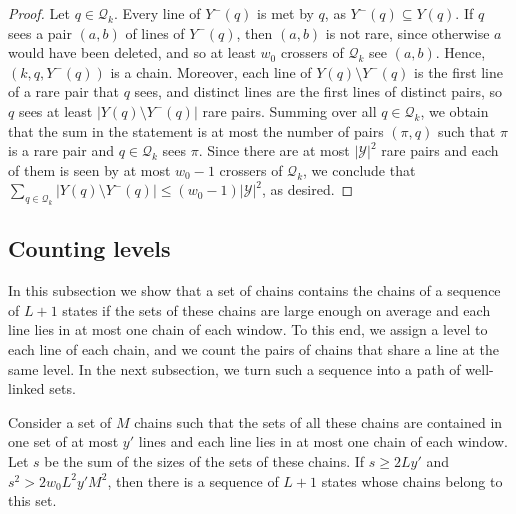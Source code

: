 \documentclass[fontsize=12pt,leading=14pt]{fullpaper}
\newcommand{\Qcal}{\mathcal{Q}}
\newcommand{\Ycal}{\mathcal{Y}}
\begin{document}
\begin{proof}
  Let $q\in\Qcal_k$.
  Every line of $Y^-(q)$ is met by $q$, as $Y^-(q)\subseteq Y(q)$.
  If $q$ sees a pair $(a,b)$ of lines of $Y^-(q)$, then $(a,b)$ is not rare, since otherwise $a$ would have been deleted, and so at least $w_0$ crossers of $\Qcal_k$ see $(a,b)$.
  Hence, $(k,q,Y^-(q))$ is a chain.
  Moreover, each line of $Y(q)\setminus Y^-(q)$ is the first line of a rare pair that $q$ sees, and distinct lines are the first lines of distinct pairs, so $q$ sees at least $|Y(q)\setminus Y^-(q)|$ rare pairs.
  Summing over all $q\in\Qcal_k$, we obtain that the sum in the statement is at most the number of pairs $(\pi,q)$ such that $\pi$ is a rare pair and $q\in\Qcal_k$ sees $\pi$.
  Since there are at most $|\Ycal|^2$ rare pairs and each of them is seen by at most $w_0-1$ crossers of $\Qcal_k$, we conclude that $\sum_{q\in\Qcal_k}|Y(q)\setminus Y^-(q)|\le(w_0-1)|\Ycal|^2$, as desired.
\end{proof}

\subsection{Counting levels}\label{sec:chains-levels}

In this subsection we show that a set of chains contains the chains of a sequence of $L+1$ states if the sets of these chains are large enough on average and each line lies in at most one chain of each window.
To this end, we assign a level to each line of each chain, and we count the pairs of chains that share a line at the same level.
In the next subsection, we turn such a sequence into a path of well-linked sets.

\begin{lemma}\label{lem:levels}
  Consider a set of $M$ chains such that the sets of all these chains are contained in one set of at most $y'$ lines and each line lies in at most one chain of each window.
  Let $s$ be the sum of the sizes of the sets of these chains.
  If $s\ge2Ly'$ and $s^2>2w_0L^2y'M^2$, then there is a sequence of $L+1$ states whose chains belong to this set.
\end{lemma}
\end{document}
